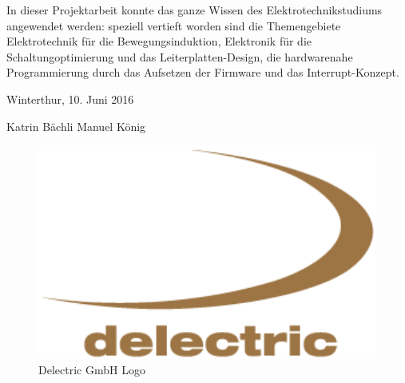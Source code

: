In dieser Projektarbeit konnte das ganze Wissen des Elektrotechnikstudiums angewendet werden: speziell vertieft worden sind die Themengebiete Elektrotechnik für die Bewegungsinduktion, Elektronik für die Schaltungoptimierung und das Leiterplatten-Design, die hardwarenahe Programmierung durch das Aufsetzen der Firmware und das Interrupt-Konzept. 


Winterthur, 10. Juni 2016


Katrin Bächli
Manuel König



\begin{figure}[ht]
   \includegraphics[width=1\textwidth]{imag_vorwort/delectric_logo_gross.gif}
   \caption{Delectric GmbH Logo}
   \label{delectric_logo} 
\end{figure}





